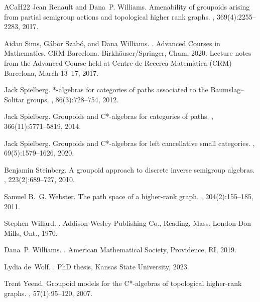 \documentclass[11pt]{amsart}
\theoremstyle{definition}
\numberwithin{thm}{section}
\numberwithin{equation}{section}
\begin{document}
\begin{thebibliography}{ACaH{\etalchar{+}}22}
Jean Renault and Dana~P. Williams.
\newblock Amenability of groupoids arising from partial semigroup actions and topological higher rank graphs.
, 369(4):2255--2283, 2017.

Aidan Sims, G\'abor Szab\'o, and Dana Williams.
.
\newblock Advanced Courses in Mathematics. CRM Barcelona. Birkh\"auser/Springer, Cham, 2020.
\newblock Lecture notes from the Advanced Course held at Centre de Recerca Matem\`atica (CRM) Barcelona, March 13--17, 2017.

Jack Spielberg.
*-algebras for categories of paths associated to the {B}aumslag--{S}olitar groups.
, 86(3):728--754, 2012.

Jack Spielberg.
\newblock Groupoids and {C}*-algebras for categories of paths.
, 366(11):5771--5819, 2014.

Jack Spielberg.
\newblock Groupoids and {C}*-algebras for left cancellative small categories.
, 69(5):1579--1626, 2020.

Benjamin Steinberg.
\newblock A groupoid approach to discrete inverse semigroup algebras.
, 223(2):689--727, 2010.

Samuel B.~G. Webster.
\newblock The path space of a higher-rank graph.
, 204(2):155--185, 2011.

Stephen Willard.
.
\newblock Addison-Wesley Publishing Co., Reading, Mass.-London-Don Mills, Ont., 1970.

Dana~P. Williams.
.
\newblock American Mathematical Society, Providence, RI, 2019.

Lydia de~Wolf.
.
\newblock PhD thesis, Kansas State University, 2023.

Trent Yeend.
\newblock Groupoid models for the {C}*-algebras of topological higher-rank graphs.
, 57(1):95--120, 2007.

\end{thebibliography}
\end{document}
